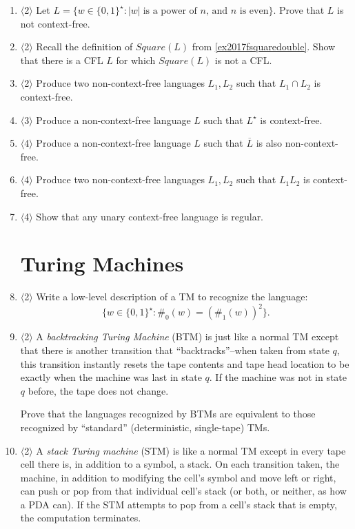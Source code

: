 \documentclass[a4paper,american,12pt]{book}
\newcommand{\Level}[1]{{\color{blue} $\langle$#1$\rangle$}}
\begin{document}
\begin{enumerate}
\item \Level{2} Let $L = \{w \in \{0, 1\}^\star : |w|\;\text{is a power of $n$, and $n$ is even}\}$. Prove that $L$ is not context-free.

\item \Level{2} Recall the definition of $Square(L)$ from \cref{ex2017fsquaredouble}. 
	Show that there is a CFL $L$ for which $Square(L)$ is not a CFL.

\item \Level{2} Produce two non-context-free languages $L_1, L_2$ such that $L_1 \cap L_2$ is context-free.

\item \Level{3} Produce a non-context-free language $L$ such that $L^\star$ is context-free.

\item \Level{4} Produce a non-context-free language $L$ such that $\overline{L}$ is also non-context-free.

\item \Level{4} Produce two non-context-free languages $L_1, L_2$ such that $L_1 L_2$ is context-free.

\item \Level{4} Show that any unary context-free language is regular.

\section{Turing Machines}

\item \Level{2} Write a low-level description of a TM to recognize the language:
\[
\{w \in \{0, 1\}^\star : \#_0(w) = (\#_1(w))^2 \}.
\]

\item \Level{2} A \emph{backtracking Turing Machine} (BTM) is just like a normal TM except that there is another transition that ``backtracks''--when taken from state $q$, this transition instantly resets the tape contents and tape head location to be exactly when the machine was last in state $q$. If the machine was not in state $q$ before, the tape does not change.

Prove that the languages recognized by BTMs are equivalent to those recognized by ``standard'' (deterministic, single-tape) TMs.

\item \Level{2} A \emph{stack Turing machine} (STM) is like a normal TM except in every tape cell there is, in addition to a symbol, a stack. On each transition taken, the machine, in addition to modifying the cell's symbol and move left or right, can push or pop from that individual cell's stack (or both, or neither, as how a PDA can). If the STM attempts to pop from a cell's stack that is empty, the computation terminates.


\end{enumerate}
\end{document}
